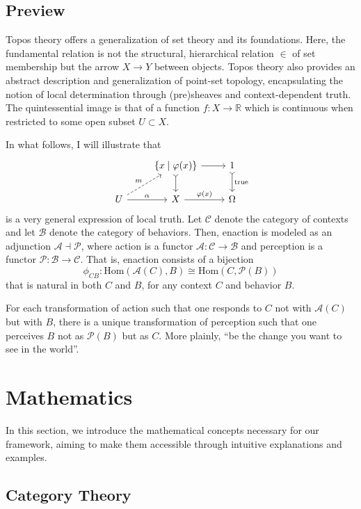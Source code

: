 \documentclass{article}
\begin{document}
\subsection{Preview}

Topos theory offers a generalization of set theory and its foundations. Here, the fundamental relation is not the structural, hierarchical relation $\in$ of set membership but the arrow $X \to Y$ between objects. Topos theory also provides an abstract description and generalization of point-set topology, encapsulating the notion of local determination through (pre)sheaves and context-dependent truth. The quintessential image is that of a function $f \colon X \to \mathbb{R}$ which is continuous when restricted to some open subset $U \subset X$.

In what follows, I will illustrate that
\[
    \begin{tikzcd}
        & \{ x \mid \varphi(x) \}  \arrow[r] \arrow[d, tail] & 1 \arrow[d, tail, "\text{true}"] \\
        U \arrow[r, "\alpha"] \arrow[ru, dashed, "m"] & X \arrow[r, "\varphi(x)"] & \Omega
    \end{tikzcd}
\]
is a very general expression of local truth. Let $\mathcal{C}$ denote the category of contexts and let $\mathcal{B}$ denote the category of behaviors. Then, enaction is modeled as an adjunction $\mathcal{A} \dashv \mathcal{P}$, where action is a functor $\mathcal{A} \colon \mathcal{C} \to \mathcal{B}$ and perception is a functor $\mathcal{P} \colon \mathcal{B} \to \mathcal{C}$. That is, enaction consists of a bijection
\[
    \phi_{CB} \colon \text{Hom} ( \mathcal{A}(C), B ) \cong \text{Hom}(C, \mathcal{P}(B))
\]
that is natural in both $C$ and $B$, for any context $C$ and behavior $B$.

For each transformation of action such that one responds to $C$ not with $\mathcal{A}(C)$ but with $B$, there is a unique transformation of perception such that one perceives $B$ not as $\mathcal{P}(B)$ but as $C$. More plainly, ``be the change you want to see in the world''.


\section{Mathematics}
In this section, we introduce the mathematical concepts necessary for our framework, aiming to make them accessible through intuitive explanations and examples.

\subsection{Category Theory}
\end{document}
